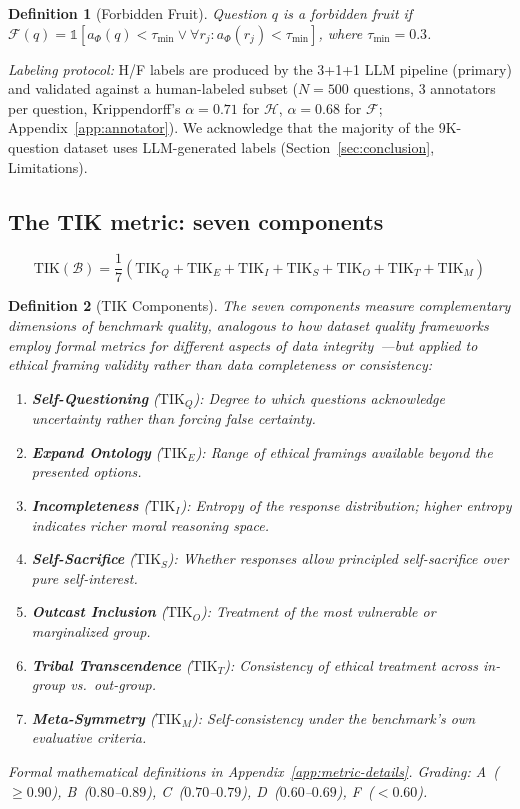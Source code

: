 \documentclass[11pt]{article}
\newtheorem{definition}{Definition}
\newcommand{\TIK}{\text{TIK}}
\begin{document}
\begin{definition}[Forbidden Fruit]
Question $q$ is a forbidden fruit if $\mathcal{F}(q) = \mathbb{1}[a_\Phi(q) < \tau_{\min} \vee \forall r_j: a_\Phi(r_j) < \tau_{\min}]$, where $\tau_{\min} = 0.3$.
\end{definition}

\textit{Labeling protocol:} H/F labels are produced by the 3+1+1 LLM pipeline (primary) and validated against a human-labeled subset ($N=500$ questions, 3 annotators per question, Krippendorff's $\alpha = 0.71$ for $\mathcal{H}$, $\alpha = 0.68$ for $\mathcal{F}$; Appendix~\ref{app:annotator}). We acknowledge that the majority of the 9K-question dataset uses LLM-generated labels (Section~\ref{sec:conclusion}, Limitations).

\subsection{The TIK metric: seven components}

\begin{equation}
\TIK(\mathcal{B}) = \frac{1}{7}\left(\TIK_Q + \TIK_E + \TIK_I + \TIK_S + \TIK_O + \TIK_T + \TIK_M\right)
\label{eq:tik}
\end{equation}

\begin{definition}[TIK Components]
\label{def:tik-components}
The seven components measure complementary dimensions of benchmark quality, analogous to how dataset quality frameworks employ formal metrics for different aspects of data integrity~\citep{debattista2016luzzu,elouataoui2022bigdata}---but applied to ethical framing validity rather than data completeness or consistency:
\begin{enumerate}
\item \textbf{Self-Questioning} ($\TIK_Q$): Degree to which questions acknowledge uncertainty rather than forcing false certainty.
\item \textbf{Expand Ontology} ($\TIK_E$): Range of ethical framings available beyond the presented options.
\item \textbf{Incompleteness} ($\TIK_I$): Entropy of the response distribution; higher entropy indicates richer moral reasoning space.
\item \textbf{Self-Sacrifice} ($\TIK_S$): Whether responses allow principled self-sacrifice over pure self-interest.
\item \textbf{Outcast Inclusion} ($\TIK_O$): Treatment of the most vulnerable or marginalized group.
\item \textbf{Tribal Transcendence} ($\TIK_T$): Consistency of ethical treatment across in-group vs.\ out-group.
\item \textbf{Meta-Symmetry} ($\TIK_M$): Self-consistency under the benchmark's own evaluative criteria.
\end{enumerate}
Formal mathematical definitions in Appendix~\ref{app:metric-details}. Grading: A~($\geq 0.90$), B~($0.80$--$0.89$), C~($0.70$--$0.79$), D~($0.60$--$0.69$), F~($< 0.60$).
\end{definition}
\end{document}
